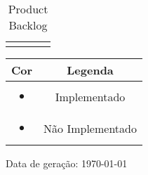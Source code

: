 \begin{landscape}
\begin{longtable}{|p{0.5in}|p{6in}|c|c|}
		\hline
		\caption{Product Backlog}
		\end{longtable}
		
		\begin{tabular}{|c|c|}
		\hline 
		{\bf Cor} & {\bf Legenda} \\
		\hline \textcolor{cImplementado}{\begin{huge} $\bullet$ \end{huge}} & Implementado \\
		\hline \textcolor{cNaoImplementado}{\begin{huge} $\bullet$ \end{huge}} & Não Implementado \\
		\hline
		\end{tabular}

		Data de geração: \today
		

\end{landscape}
